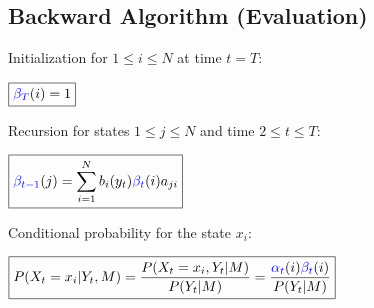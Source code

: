 \begin{minipage}[t]{0.49\textwidth}
\subsection{Backward Algorithm (Evaluation)}

\begin{aufzaehlung}
	\item Initialization for $1 \leq i \leq N$ at time $t=T$:\\
	
	\vspace{-0.3cm}
	
	$\boxed{\textcolor{blue}{\beta_T}(i)=1}$
	\item Recursion for states $1 \leq j \leq N$ and time $2\leq t\leq T$:\\
	
	\vspace{-0.3cm}
	
	 $\boxed{\textcolor{blue}{\beta_{t-1}}(j)=\sum\limits_{i=1}^{N}{b_i(y_t)\textcolor{blue}{\beta_t}(i)a_{ji}}}$
	 \item Conditional probability for the state $x_i$:\\
	 	
	 \vspace{-0.3cm}
	 	
	 $\boxed{P(X_t=x_i|Y_t,M)=\frac{P(X_t=x_i,Y_t|M)}{P(Y_t|M)}=\frac{\textcolor{blue}{\alpha_t}(i)\textcolor{blue}{\beta_t}(i)}{P(Y_t|M)}}$
	 
\end{aufzaehlung}
\end{minipage}

\vspace{1cm}


